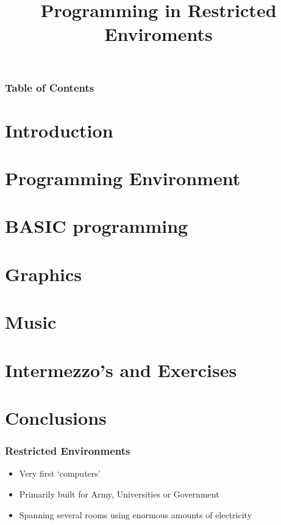 \documentclass[aspectratio=43]{uva-inf-presentation}
\title{Programming in Restricted Enviroments}
\begin{document}
\begin{titelframe}
\titlepage

\end{titelframe}

\begin{frame}[noframenumbering]
\frametitle{Table of Contents}
\tableofcontents
\end{frame}

\section{Introduction}
\section{Programming Environment}
\section{BASIC programming}
\section{Graphics}
\section{Music}
\section{Intermezzo's and Exercises}

\section{Conclusions}


\begin{frame}[noframenumbering]
\frametitle{Restricted Environments}

\begin{itemize}
\item Very first `computers'
\item Primarily built for Army, Universities or Government
\item Spanning several rooms using enormous amounts of electricity
\end{itemize}

\end{frame}

\end{document}
